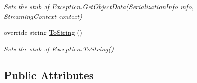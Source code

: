 \begin{DoxyCompactItemize}
\begin{DoxyCompactList}\small\item\em Sets the stub of Exception.\-Get\-Object\-Data(\-Serialization\-Info info, Streaming\-Context context)\end{DoxyCompactList}\item 
override string \hyperlink{class_system_1_1_fakes_1_1_stub_operation_canceled_exception_a5f921a31ed7840cd223c10d6824aa0b1}{To\-String} ()
\begin{DoxyCompactList}\small\item\em Sets the stub of Exception.\-To\-String()\end{DoxyCompactList}\end{DoxyCompactItemize}
\subsection*{Public Attributes}
